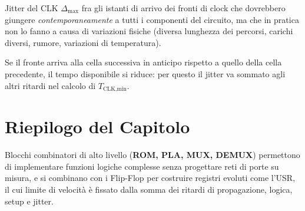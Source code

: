 \begin{center}
\end{center}

\begin{definizione}{Jitter del CLK}
$\Delta_{\max}$ fra gli istanti di arrivo dei fronti di clock che dovrebbero giungere
\emph{contemporaneamente} a tutti i componenti del circuito, ma che in pratica non lo fanno a
causa di variazioni fisiche (diversa lunghezza dei percorsi, carichi diversi, rumore,
variazioni di temperatura).
\end{definizione}

\noindent Se il fronte arriva alla cella successiva in anticipo rispetto a quello della cella
precedente, il tempo disponibile si riduce: per questo il jitter va sommato agli altri
ritardi nel calcolo di $T_{\text{CLK,min}}$.

\section*{Riepilogo del Capitolo}

\begin{important}
Blocchi combinatori di alto livello (\textbf{ROM, PLA, MUX, DEMUX}) permettono di implementare funzioni logiche complesse senza progettare reti di porte su misura, e si combinano con i Flip-Flop per costruire registri evoluti come l'USR, il cui limite di velocità è fissato dalla somma dei ritardi di propagazione, logica, setup e jitter.
\end{important}

